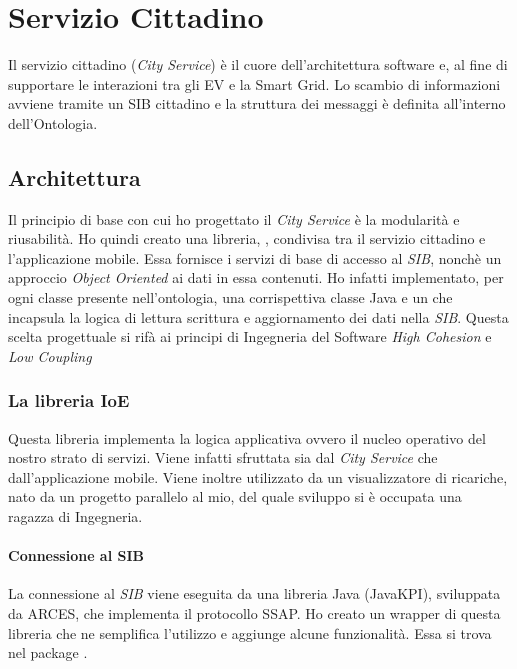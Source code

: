 \chapter{Servizio Cittadino}

Il servizio cittadino (\emph{City Service}) è il cuore dell'architettura software e, al fine di supportare le interazioni tra gli EV e la Smart Grid. Lo scambio di informazioni avviene tramite un SIB cittadino e la struttura dei messaggi è definita all'interno dell'Ontologia. 

\section{Architettura}

Il principio di base con cui ho progettato il \emph{City Service} è la modularità e riusabilità. Ho quindi creato una libreria, , condivisa tra il servizio cittadino e l'applicazione mobile. Essa fornisce i servizi di base di accesso al \emph{SIB}, nonchè un approccio \emph{Object Oriented} ai dati in essa contenuti. Ho infatti implementato, per ogni classe presente nell'ontologia, una corrispettiva classe  Java e un  che incapsula la logica di lettura scrittura e aggiornamento dei dati nella \emph{SIB}. Questa scelta progettuale si rifà ai principi di Ingegneria del Software \emph{High Cohesion} e \emph{Low Coupling} \cite{larcab2005}

\subsection{La libreria IoE}

Questa libreria implementa la logica applicativa ovvero il nucleo operativo del nostro strato di servizi. Viene infatti sfruttata sia dal \emph{City Service} che dall'applicazione mobile. Viene inoltre utilizzato da un visualizzatore di ricariche, nato da un progetto parallelo al mio, del quale sviluppo si è occupata una ragazza di Ingegneria.

\subsubsection{Connessione al SIB}\label{conn-sib}

La connessione al \emph{SIB} viene eseguita da una libreria Java (JavaKPI), sviluppata da ARCES, che implementa il protocollo SSAP. Ho creato un wrapper di questa libreria che ne semplifica l'utilizzo e aggiunge alcune funzionalità. Essa si trova nel package .

